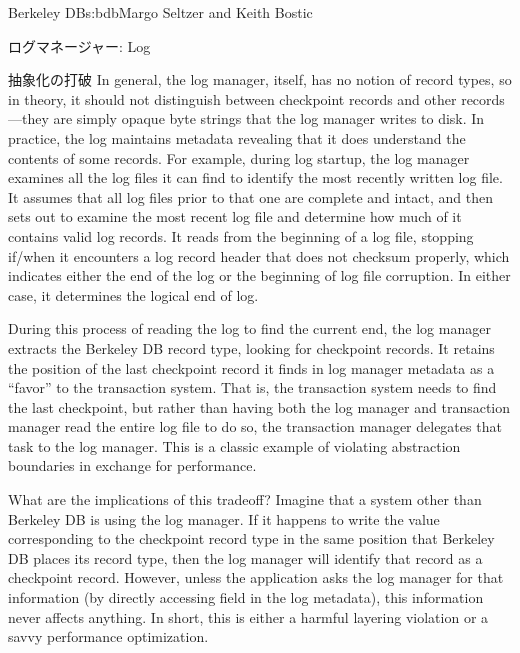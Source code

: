 \begin{aosachapter}{Berkeley DB}{s:bdb}{Margo Seltzer and Keith Bostic}
\begin{aosasect1}{ログマネージャー: Log}
\begin{aosasect2}{抽象化の打破}
In general, the log manager, itself, has no notion of record types, so
in theory, it should not distinguish between checkpoint records and
other records---they are simply opaque byte strings that the log
manager writes to disk. In practice, the log maintains metadata
revealing that it does understand the contents of some records. For
example, during log startup, the log manager examines all the log
files it can find to identify the most recently written log file. It
assumes that all log files prior to that one are complete and intact,
and then sets out to examine the most recent log file and determine
how much of it contains valid log records. It reads from the beginning
of a log file, stopping if/when it encounters a log record header that
does not checksum properly, which indicates either the end of the log
or the beginning of log file corruption. In either case, it determines
the logical end of log.

During this process of reading the log to find the current end, the
log manager extracts the Berkeley DB record type, looking for
checkpoint records. It retains the position of the last checkpoint
record it finds in log manager metadata as a ``favor'' to the
transaction system. That is, the transaction system needs to find the
last checkpoint, but rather than having both the log manager and
transaction manager read the entire log file to do so, the transaction
manager delegates that task to the log manager. This is a classic
example of violating abstraction boundaries in exchange for
performance.

What are the implications of this tradeoff? Imagine that a system
other than Berkeley DB is using the log manager. If it happens to
write the value corresponding to the checkpoint record type in the
same position that Berkeley DB places its record type, then the log
manager will identify that record as a checkpoint record. However,
unless the application asks the log manager for that information (by
directly accessing  field in the log metadata),
this information never affects anything. In short, this is either a
harmful layering violation or a savvy performance optimization.


\end{aosasect2}
\end{aosasect1}
\end{aosachapter}

